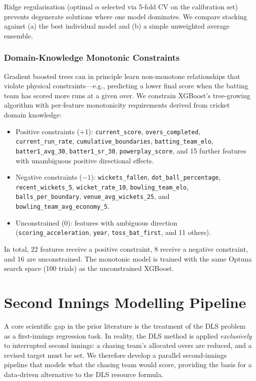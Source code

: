\documentclass[12pt,a4paper,oneside]{report}
\begin{document}
Ridge regularisation (optimal $\alpha$ selected via 5-fold CV on the calibration set) prevents degenerate solutions where one model dominates.  We compare stacking against (a) the best individual model and (b) a simple unweighted average ensemble.

\subsubsection*{Domain-Knowledge Monotonic Constraints}
\label{sec:monotonic}

Gradient boosted trees can in principle learn non-monotone relationships that violate physical constraints---e.g., predicting a lower final score when the batting team has scored more runs at a given over.  We constrain XGBoost's tree-growing algorithm with per-feature monotonicity requirements derived from cricket domain knowledge:

\begin{itemize}[nosep]
    \item Positive constraints (+1): \texttt{current\_score}, \texttt{overs\_completed}, \texttt{current\_run\_rate}, \texttt{cumulative\_boundaries}, \texttt{batting\_team\_elo}, \texttt{batter1\_avg\_30}, \texttt{batter1\_sr\_30}, \texttt{powerplay\_score}, and 15 further features with unambiguous positive directional effects.
    \item Negative constraints ($-1$): \texttt{wickets\_fallen}, \texttt{dot\_ball\_percentage}, \texttt{recent\_wickets\_5}, \texttt{wicket\_rate\_10}, \texttt{bowling\_team\_elo}, \texttt{balls\_per\_boundary}, \texttt{venue\_avg\_wickets\_25}, and \texttt{bowling\_team\_avg\_economy\_5}.
    \item Unconstrained (0): features with ambiguous direction (\texttt{scoring\_acceleration}, \texttt{year}, \texttt{toss\_bat\_first}, and 11 others).
\end{itemize}

In total, 22 features receive a positive constraint, 8 receive a negative constraint, and 16 are unconstrained.  The monotonic model is trained with the same Optuna search space (100 trials) as the unconstrained XGBoost.

\section{Second Innings Modelling Pipeline}
\label{sec:second_innings}

A core scientific gap in the prior literature is the treatment of the DLS problem as a first-innings regression task.  In reality, the DLS method is applied \emph{exclusively} to interrupted second innings: a chasing team's allocated overs are reduced, and a revised target must be set.  We therefore develop a parallel second-innings pipeline that models what the chasing team would score, providing the basis for a data-driven alternative to the DLS resource formula.
\end{document}
